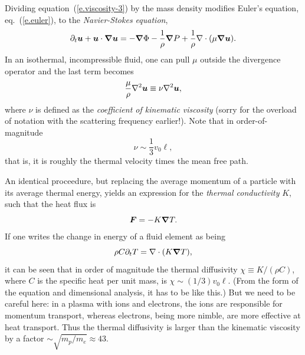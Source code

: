 Dividing equation~(\ref{e.viscosity-3}) by the mass density modifies Euler's equation, eq.~(\ref{e.euler}), to the \emph{Navier-Stokes equation},
\begin{equation}\label{e.navier-stokes}
\partial_{t}\boldsymbol{u} + \boldsymbol{u}\cdot\boldsymbol{\nabla}\boldsymbol{u} = -\boldsymbol{\nabla} \Phi - \frac{1}{\rho}\boldsymbol{\nabla} P + \frac{1}{\rho}\nabla \cdot(\mu \boldsymbol{\nabla}\boldsymbol{u}).
\end{equation}
In an isothermal, incompressible fluid, one can pull $\mu$ outside the divergence operator and the last term becomes
\[ \frac{\mu}{\rho}\nabla^{2}\boldsymbol{u} \equiv \nu \nabla^{2}\boldsymbol{u}, \]
where $\nu$ is defined as the \emph{coefficient of kinematic viscosity} (sorry for the overload of notation with the scattering frequency earlier!). Note that in order-of-magnitude
\[ \nu \sim \frac{1}{3}v_{0}\ell,\]
that is, it is roughly the thermal velocity times the mean free path.

An identical proceedure, but replacing the average momentum of a particle with its average thermal energy, yields an expression for the \emph{thermal conductivity} $K$, such that the heat flux is
\begin{equation}\label{e.flux-equation}
\boldsymbol{F} = -K\boldsymbol{\nabla} T.
\end{equation}
If one writes the change in energy of a fluid element as being 
\[\rho C \partial_{t}T = \nabla \cdot(K\boldsymbol{\nabla} T),\]
 it can be seen that in order of magnitude the thermal diffusivity $\chi \equiv K/(\rho C)$, where $C$ is the specific heat per unit mass, is $\chi \sim (1/3) v_{0} \ell$.  (From the form of the equation and dimensional analysis, it has to be like this.)  But we need to be careful here: in a plasma with ions and electrons, the ions are responsible for momentum transport, whereas electrons, being more nimble, are more effective at heat transport.  Thus the thermal diffusivity is larger than the kinematic viscosity by a factor $\sim \sqrt{m_{p}/m_{e}}\approx 43$.

